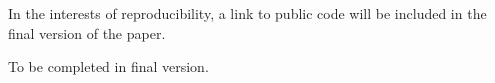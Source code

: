 \documentclass[sigconf,anonymous,review]{acmart}
\begin{document}

\maketitle















In the interests of reproducibility, a link to public code will be
included in the final version of the paper.

To be completed in final version.

\balance %

 
\end{document}

